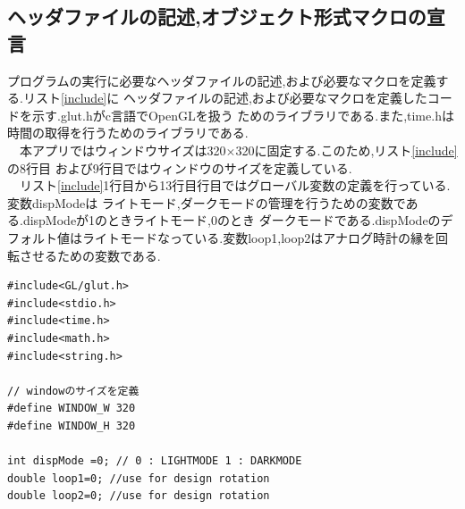 \documentclass[a4j]{jarticle}
\begin{document}
    \subsection{ヘッダファイルの記述,オブジェクト形式マクロの宣言}
    プログラムの実行に必要なヘッダファイルの記述,および必要なマクロを定義する.リスト\ref{include}に
    ヘッダファイルの記述,および必要なマクロを定義したコードを示す.glut.hがc言語でOpenGLを扱う
    ためのライブラリである.また,time.hは時間の取得を行うためのライブラリである.\\
    　本アプリではウィンドウサイズは320$\times$320に固定する.このため,リスト\ref{include}の8行目
    および9行目ではウィンドウのサイズを定義している.\\
    　リスト\ref{include}1行目から13行目行目ではグローバル変数の定義を行っている.変数dispModeは
    ライトモード,ダークモードの管理を行うための変数である.dispModeが1のときライトモード,0のとき
    ダークモードである.dispModeのデフォルト値はライトモードなっている.変数loop1,loop2はアナログ時計の縁を回転させるための変数である.
    \begin{lstlisting}[basicstyle=\ttfamily\footnotesize, frame=single,label=include,caption=定数および変数の定義]
#include<GL/glut.h>
#include<stdio.h>
#include<time.h>
#include<math.h>
#include<string.h>

// windowのサイズを定義
#define WINDOW_W 320
#define WINDOW_H 320

int dispMode =0; // 0 : LIGHTMODE 1 : DARKMODE
double loop1=0; //use for design rotation
double loop2=0; //use for design rotation
                  \end{lstlisting}
\end{document}
